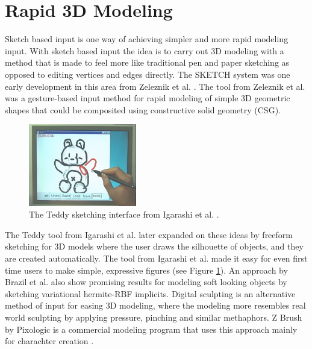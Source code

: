 \documentclass[a4paper,12pt]{report}
\begin{document}
\section{Rapid 3D Modeling}
 Sketch based input is one way of achieving simpler and more rapid modeling input. With sketch based input the idea is to carry out 3D modeling with a method that is made to feel more like traditional pen and paper sketching as opposed to editing vertices and edges directly.
The SKETCH system was one early development in this area from Zeleznik et al. \cite{zeleznik2007sketch}. The tool from Zeleznik et al. was a gesture-based input method for rapid modeling of simple 3D geometric shapes that could be composited using constructive solid geometry (CSG). 
\begin{figure}

  \begin{center}
    \includegraphics[width=0.42\textwidth]{thesis/related/teddy.png}
  \end{center}
 
  \caption{The Teddy sketching interface from Igarashi et al. \cite{Igarashi:1999:TSI:311535.311602}.}
  \label{fig:teddy}
  
\end{figure}
The Teddy tool from Igarashi et al. \cite{Igarashi:1999:TSI:311535.311602} later expanded on these ideas by freeform sketching for 3D models where the user draws the silhouette of objects, and they are created automatically. The tool from Igarashi et al. made it easy for even first time users to make simple, expressive figures (see Figure \ref{fig:teddy}). An approach by Brazil et al. \cite{brazil2010sketching} also show promising results for modeling soft looking objects by sketching variational hermite-RBF implicits.
Digital sculpting is an alternative method of input for easing 3D modeling, where the modeling more resembles real world sculpting by applying pressure, pinching and similar methaphors. Z Brush by Pixologic is a commercial modeling program that uses this approach mainly for charachter creation \cite{spencer2008zbrush}.
\end{document}
